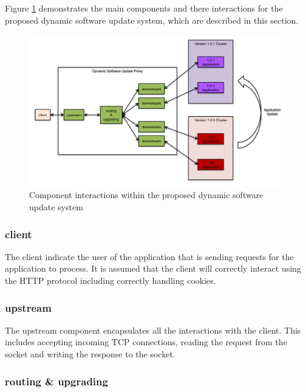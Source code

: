 \documentclass[a4paper,11pt,twoside]{report}
\begin{document}
Figure \ref{proposed_solution} demonstrates the main components and there interactions for the proposed dynamic software update system, which are described in this section.

\begin{figure}[!ht]
  \centering
     \includegraphics[scale=0.31]{proposed_solution}
  \caption{Component interactions within the proposed  dynamic software update system}
  \label{proposed_solution}
\end{figure}

\subsubsection*{client}

\noindent
The client indicate the user of the application that is sending requests for the application to process.  It is assumed that the client will correctly interact using the HTTP protocol including correctly handling cookies.

\subsubsection*{upstream}

\noindent
The upstream component encapsulates all the interactions with the client.  This includes accepting incoming TCP connections, reading the request from the socket and writing the response to the socket.

\subsubsection*{routing \& upgrading}
\end{document}
